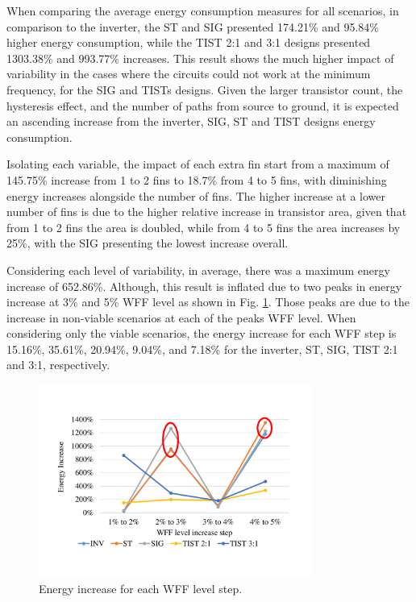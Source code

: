 \documentclass[pgmicro,mestrado,english]{iiufrgs}
\begin{document}
When comparing the average energy consumption measures for all scenarios, in comparison to the inverter, the ST and SIG presented 174.21\% and 95.84\% higher energy consumption, while the TIST 2:1 and 3:1 designs presented 1303.38\% and 993.77\% increases. This result shows the much higher impact of variability in the cases where the circuits could not work at the minimum frequency, for the SIG and TISTs designs. Given the larger transistor count, the hysteresis effect, and the number of paths from source to ground, it is expected an ascending increase from the inverter, SIG, ST and TIST designs energy consumption.

Isolating each variable, the impact of each extra fin start from a maximum of 145.75\% increase from 1 to 2 fins to 18.7\% from 4 to 5 fins, with diminishing energy increases alongside the number of fins. The higher increase at a lower number of fins is due to the higher relative increase in transistor area, given that from 1 to 2 fins the area is doubled, while from 4 to 5 fins the area increases by 25\%, with the SIG presenting the lowest increase overall.

Considering each level of variability, in average, there was a maximum energy increase of 652.86\%. Although, this result is inflated due to two peaks in energy increase at 3\% and 5\% WFF level as shown in Fig. \ref{fig:energyWFFstep}. Those peaks are due to the increase in non-viable scenarios at each of the peaks WFF level. When considering only the viable scenarios, the energy increase for each WFF step is 15.16\%, 35.61\%, 20.94\%, 9.04\%, and 7.18\% for the inverter, ST, SIG, TIST 2:1 and 3:1, respectively.

\begin{figure}[h]
	\centering
		\includegraphics[width=0.8\textwidth, trim={2cm 3cm 2cm 3cm}, clip]{energyIncreaseWFFstep.pdf}
		\caption{Energy increase for each WFF level step.}
	\label{fig:energyWFFstep}
\end{figure}
\end{document}
